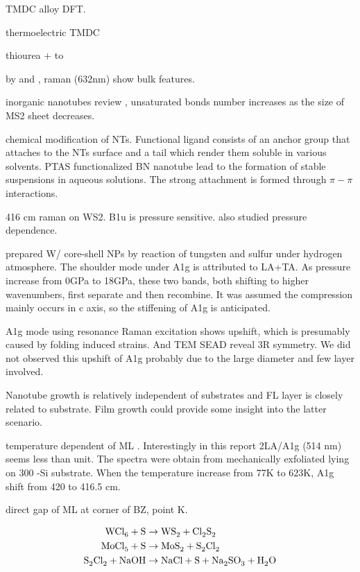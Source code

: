 \cite{Kang2013} TMDC alloy DFT.

thermoelectric TMDC \cite{Wickramaratne2014}

 thiourea +  to  \cite{Leonard-Deepak2011}

 by  and , raman (632nm) show bulk features\cite{Tenne2008}.

inorganic nanotubes review \cite{Tenne2004} , unsaturated bonds number increases as the size of MS2 sheet decreases.

\cite{Tenne2010} chemical modification of NTs. Functional ligand consists of an anchor group that attaches to the NTs surface and a tail which render them soluble in various solvents. PTAS functionalized BN nanotube lead to the formation of stable suspensions in aqueous solutions. The strong attachment is formed through $\pi-\pi$ interactions.

416 cm raman on WS2. B1u is pressure sensitive. \cite{Staiger2012} also studied pressure dependence. 

\cite{Zou2007} prepared W/ core-shell NPs by reaction of tungsten and sulfur under hydrogen atmosphere. The shoulder mode under A1g is attributed to LA+TA. As pressure increase from 0GPa to 18GPa, these two bands, both shifting to higher wavenumbers, first separate and then recombine. It was assumed the compression mainly occurs in c axis, so the stiffening of A1g is anticipated.


A1g mode using resonance Raman excitation shows upshift, which is presumably caused by folding induced strains. And TEM SEAD reveal 3R symmetry. We did not observed this upshift of A1g probably due to the large diameter and few layer involved.

Nanotube growth is relatively independent of substrates and FL layer is closely related to substrate. Film growth could provide some insight into the latter scenario.

\cite{M2013} temperature dependent of ML . Interestingly in this report 2LA/A1g (514 nm) seems less than unit. The spectra were obtain from mechanically exfoliated  lying on 300 -Si substrate.  When the temperature increase from 77K to 623K, A1g shift from 420 to 416.5 cm.




direct gap of ML at corner of BZ, point K.

\begin{align}
\cee{WCl6 + S &\rightarrow WS2 + Cl2S2}\\
\cee{MoCl5 + S &\rightarrow MoS2 + S2Cl2} \\
\cee{S2Cl2 + NaOH &\rightarrow NaCl + S + Na2SO3 + H2O}
\end{align}
